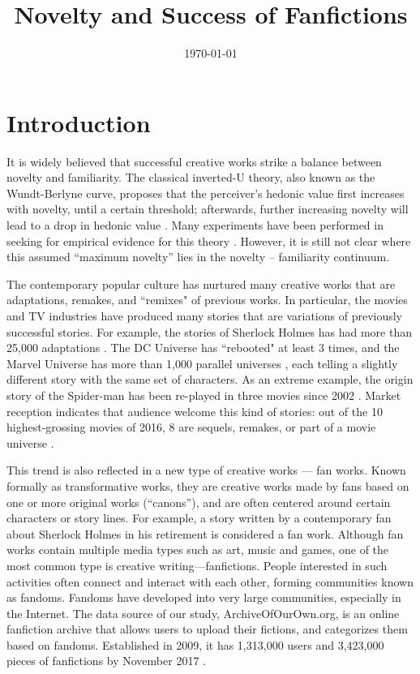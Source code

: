 \documentclass[a4paper]{article}
\begin{document}

\title{Novelty and Success of Fanfictions} %
\date{\today}
\maketitle %

\section{Introduction} %
\label{sec:introduction}

It is widely believed that successful creative works strike a balance between novelty and familiarity. The classical inverted-U theory, also known as the Wundt-Berlyne curve, proposes that the perceiver's hedonic value first increases with novelty, until a certain threshold; afterwards, further increasing novelty will lead to a drop in hedonic value \cite{berlyne1970novelty}. Many experiments have been performed in seeking for empirical evidence for this theory \cite{hargreaves1984effects} \cite{sluckin1980liking}. However, it is still not clear where this assumed ``maximum novelty'' lies in the novelty -- familiarity continuum.

The contemporary popular culture has nurtured many creative works that are adaptations, remakes, and ``remixes" \cite{manovich2007comes} of previous works. In particular, the movies and TV industries have produced many stories that are variations of previously successful stories. For example, the stories of Sherlock Holmes has had more than 25,000 adaptations \cite{doyle2007new}. The DC Universe has ``rebooted" at least 3 times, and the Marvel Universe has more than 1,000 parallel universes \cite{marvelmultiverse}, each telling a slightly different story with the same set of characters. As an extreme example, the origin story of the Spider-man has been re-played in three movies since 2002 \cite{spiderman}. Market reception indicates that audience welcome this kind of stories: out of the 10 highest-grossing movies of 2016, 8 are sequels, remakes, or part of a movie universe \cite{2016film}.

This trend is also reflected in a new type of creative works --- fan works. Known formally as transformative works, they are creative works made by fans based on one or more original works (``canons''), and are often centered around certain characters or story lines\cite{wiki:transf_work}. For example, a story written by a contemporary fan about Sherlock Holmes in his retirement is considered a fan work. Although fan works contain multiple media types such as art, music and games, one of the most common type is creative writing---fanfictions. People interested in such activities often connect and interact with each other, forming communities known as fandoms\cite{wiki:fandom}. Fandoms have developed into very large communities, especially in the Internet. The data source of our study, ArchiveOfOurOwn.org, is an online fanfiction archive that allows users to upload their fictions, and categorizes them based on fandoms. Established in 2009, it has 1,313,000 users and 3,423,000 pieces of fanfictions by November 2017 \cite{ao3stats}.
\end{document}
